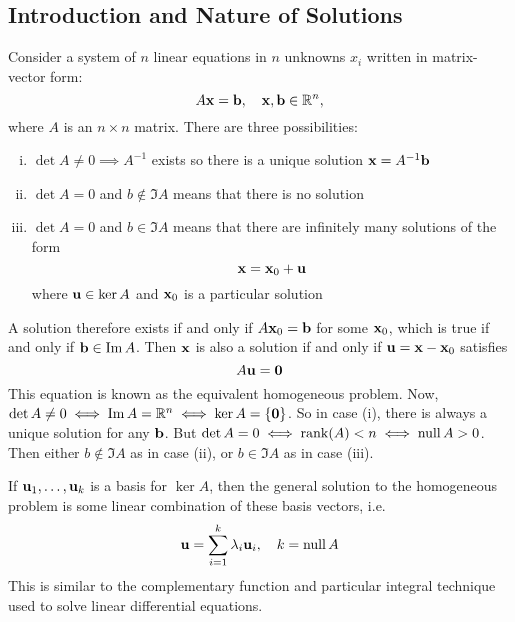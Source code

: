 \subsection{Introduction and Nature of Solutions}
Consider a system of \(n\) linear equations in \(n\) unknowns \(x_i\) written in matrix-vector form:
\[
	A\vb x = \vb b,\quad \vb x, \vb b \in \mathbb R^n,
\]
where \(A\) is an \(n \times n\) matrix.
There are three possibilities:
\begin{enumerate}[(i)]
	\item \(\det A \neq 0 \implies A^{-1}\) exists so there is a unique solution \(\vb x = A^{-1} \vb b\)
	\item \(\det A = 0\) and \(b \notin \Im A\) means that there is no solution
	\item \(\det A = 0\) and \(b \in \Im A\) means that there are infinitely many solutions of the form
	      \[
		      \vb x = \vb x_0 + \vb u
	      \]
	      where \(\vb u \in \ker A\) and \(\vb x_0\) is a particular solution
\end{enumerate}
A solution therefore exists if and only if \(A\vb x_0 = \vb b\) for some \(\vb x_0\), which is true if and only if \(\vb b \in \Im A\).
Then \(\vb x\) is also a solution if and only if \(\vb u = \vb x - \vb x_0\) satisfies
\[
	A\vb u = \vb 0
\]
This equation is known as the equivalent homogeneous problem.
Now, \(\det A \neq 0 \iff \Im A = \mathbb R^n \iff \ker A = \{ \vb 0 \}\).
So in case (i), there is always a unique solution for any \(\vb b\).
But \(\det A = 0 \iff \rank(A) < n \iff \operatorname{null} A > 0\).
Then either \(b \notin \Im A\) as in case (ii), or \(b \in \Im A\) as in case (iii).

If \(\vb u_1, \dots, \vb u_k\) is a basis for \(\ker A\), then the general solution to the homogeneous problem is some linear combination of these basis vectors, i.e.
\[
	\vb u = \sum_{i=1}^k \lambda_i \vb u_i,\quad k = \operatorname{null} A
\]
This is similar to the complementary function and particular integral technique used to solve linear differential equations.

